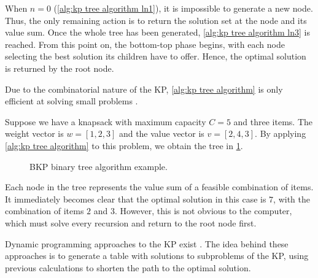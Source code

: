 When $n = 0$ (\cref{alg:kp tree algorithm ln1}), it is impossible to generate a new node. Thus, the only remaining action is to return the solution set at the node and its value sum. Once the whole tree has been generated, \cref{alg:kp tree algorithm ln3} is reached. From this point on, the bottom-top phase begins, with each node selecting the best solution its children have to offer. Hence, the optimal solution is returned by the root node.

Due to the combinatorial nature of the KP, \cref{alg:kp tree algorithm} is only efficient at solving small problems \cite{FEOFILOFF2020a}.

\begin{example}
    Suppose we have a knapsack with maximum capacity $C = 5$ and three items. The weight vector is $w = [1, 2, 3]$ and the value vector is $v = [2, 4, 3]$. By applying \cref{alg:kp tree algorithm} to this problem, we obtain the tree in \cref{fig:kp tree example}.

    \begin{figure}[h]
        \centering
        \caption{BKP binary tree algorithm example.}
        \label{fig:kp tree example}
    \end{figure}
    Each node in the tree represents the value sum of a feasible combination of items. It immediately becomes clear that the optimal solution in this case is $7$, with the combination of items $2$ and $3$. However, this is not obvious to the computer, which must solve every recursion and return to the root node first.
\end{example}

Dynamic programming \cite{BRADLEY1977,WAGNER1995} approaches to the KP exist \cite{FEOFILOFF2020a,HRISTAKEVA2005,DEMAINE2011}. The idea behind these approaches is to generate a table with solutions to subproblems of the KP, using previous calculations to shorten the path to the optimal solution.

